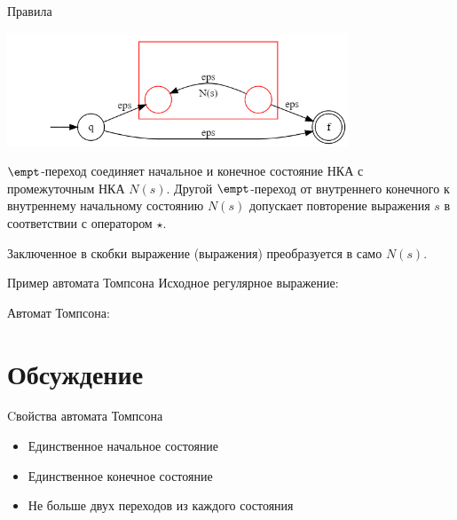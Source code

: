 \begin{frame}{Правила}
{        \includegraphics[width=4in, keepaspectratio]{tompson_rule5.png} %

        $\empt$-переход соединяет начальное и конечное состояние НКА с промежуточным НКА $N(s)$. Другой $\empt$-переход от внутреннего конечного к внутреннему начальному состоянию $N(s)$ допускает повторение выражения $s$ в соответствии с оператором $\star$.

        Заключенное в скобки выражение (выражения) преобразуется в само $N(s)$.
    }
\end{frame}%

\begin{frame}{Пример автомата Томпсона}
    Исходное регулярное выражение:

    Автомат Томпсона:

\end{frame}

\section{Обсуждение}
\begin{frame}{Cвойства автомата Томпсона}
    \begin{itemize}
        \item Единственное начальное состояние
        \item Единственное конечное состояние
        \item Не больше двух переходов из каждого состояния
    \end{itemize}
\end{frame}
